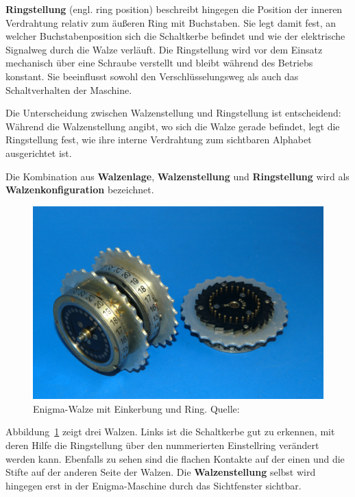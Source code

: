\documentclass[12pt, ngerman, a4paper, numbers=noenddot]{article}
\begin{document}
\textbf{Ringstellung} (engl. ring position) beschreibt hingegen die Position der inneren Verdrahtung relativ zum äußeren Ring mit Buchstaben. Sie legt damit fest, an welcher Buchstabenposition sich die Schaltkerbe befindet und wie der elektrische Signalweg durch die Walze verläuft. Die Ringstellung wird vor dem Einsatz mechanisch über eine Schraube verstellt und bleibt während des Betriebs konstant. Sie beeinflusst sowohl den Verschlüsselungsweg als auch das Schaltverhalten der Maschine.

Die Unterscheidung zwischen Walzenstellung und Ringstellung ist entscheidend: Während die Walzenstellung angibt, wo sich die Walze gerade befindet, legt die Ringstellung fest, wie ihre interne Verdrahtung zum sichtbaren Alphabet ausgerichtet ist.

Die Kombination aus \textbf{Walzenlage}, \textbf{Walzenstellung} und \textbf{Ringstellung} wird als \textbf{Walzenkonfiguration} bezeichnet.

\begin{figure}[H]
	\centering
	\includegraphics[width=1\textwidth]{bilder/Enigma_rotor.jpg}
	\caption{Enigma-Walze mit Einkerbung und Ring. Quelle: \cite{wiki:enigma_walzen}}
	\label{fig:Explosionsansicht}
\end{figure}

Abbildung~\ref{fig:Explosionsansicht} zeigt drei Walzen. Links ist die Schaltkerbe gut zu erkennen, mit deren Hilfe die Ringstellung über den nummerierten Einstellring verändert werden kann. Ebenfalls zu sehen sind die flachen Kontakte auf der einen und die Stifte auf der anderen Seite der Walzen. Die \textbf{Walzenstellung} selbst wird hingegen erst in der Enigma-Maschine durch das Sichtfenster sichtbar.
\end{document}
